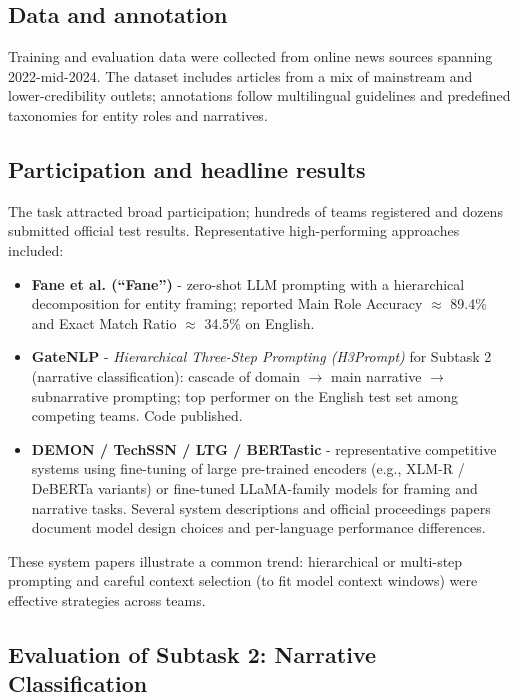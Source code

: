 \subsection{Data and annotation}
Training and evaluation data were collected from online news sources spanning 2022-mid-2024. The dataset includes articles from a mix of mainstream and lower-credibility outlets; annotations follow multilingual guidelines and predefined taxonomies for entity roles and narratives. \cite{propaganda_site2025}

\subsection{Participation and headline results}
The task attracted broad participation; hundreds of teams registered and dozens submitted official test results. Representative high-performing approaches included:
\begin{itemize}
  \item \textbf{Fane et al. (``Fane'')} - zero-shot LLM prompting with a hierarchical decomposition for entity framing; reported Main Role Accuracy $\approx$ 89.4\% and Exact Match Ratio $\approx$ 34.5\% on English. \cite{Fane2025}
  \item \textbf{GateNLP} - \emph{Hierarchical Three-Step Prompting (H3Prompt)} for Subtask 2 (narrative classification): cascade of domain $\rightarrow$ main narrative $\rightarrow$ subnarrative prompting; top performer on the English test set among competing teams. Code published. \cite{Singh2025}
  \item \textbf{DEMON / TechSSN / LTG / BERTastic} - representative competitive systems using fine-tuning of large pre-trained encoders (e.g., XLM-R / DeBERTa variants) or fine-tuned LLaMA-family models for framing and narrative tasks. Several system descriptions and official proceedings papers document model design choices and per-language performance differences. \cite{Fenu2025, Premnath2025, Ronningstad2025, Nakov2025}
\end{itemize}
These system papers illustrate a common trend: hierarchical or multi-step prompting and careful context selection (to fit model context windows) were effective strategies across teams. \cite{Fane2025, Singh2025, Ronningstad2025}

\subsection{Evaluation of Subtask 2: Narrative Classification}
\label{subsec:evaluation-subtask2}

